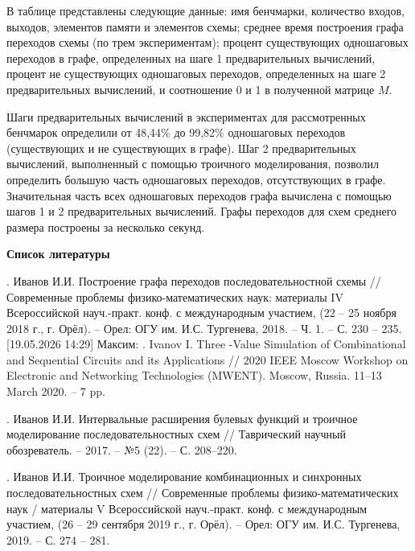 \documentclass[a4paper,12pt]{article}
\begin{document}
\vspace{0.3cm}

В таблице представлены следующие данные: имя бенчмарки, количество входов, выходов, элементов памяти и элементов схемы; среднее время построения графа переходов схемы (по трем экспериментам); процент существующих одношаговых переходов в графе, определенных на шаге 1 предварительных вычислений, процент не существующих одношаговых переходов, определенных на шаге 2 предварительных вычислений, и соотношение 0 и 1 в полученной матрице $M$.

\vspace{0.2cm}

Шаги предварительных вычислений в экспериментах для рассмотренных бенчмарок определили от 48,44\% до 99,82\% одношаговых переходов (существующих и не существующих в графе). Шаг 2 предварительных вычислений, выполненный с помощью троичного моделирования, позволил определить большую часть одношаговых переходов, отсутствующих в графе. Значительная часть всех одношаговых переходов графа вычислена с помощью шагов 1 и 2 предварительных вычислений. Графы переходов для схем среднего размера построены за несколько секунд.


\begin{center}
\textbf{Список литературы}
\end{center}

. Иванов И.И. Построение графа переходов последовательностной схемы // Современные проблемы физико-математических наук: материалы IV Всероссийской науч.-практ. конф. с международным участием, (22 -- 25 ноября 2018 г., г. Орёл). -- Орел: ОГУ им. И.С. Тургенева, 2018. -- Ч. 1. -- С. 230 -- 235.
[19.05.2026 14:29] Максим: . Ivanov I. Three -Value Simulation of Combinational and Sequential Circuits and its Applications // 2020 IEEE Moscow Workshop on Electronic and Networking Technologies (MWENT). Moscow, Russia. 11--13 March 2020. -- 7 pp.

. Иванов И.И. Интервальные расширения булевых функций и троичное моделирование последовательностных схем // Таврический научный обозреватель. -- 2017. -- №5 (22). -- С. 208--220.

. Иванов И.И. Троичное моделирование комбинационных и синхронных последовательностных схем // Современные проблемы физико-математических наук / материалы V Всероссийской науч.-практ. конф. с международным участием, (26 -- 29 сентября 2019 г., г. Орёл). -- Орел: ОГУ им. И.С. Тургенева, 2019. -- С. 274 -- 281.
\end{document}
